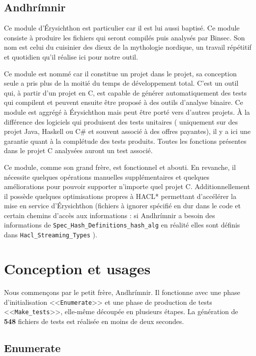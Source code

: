 \subsection*{Andhrímnir}

Ce module d'Érysichthon est particulier car il est lui aussi baptisé. Ce module consiste à produire les fichiers qui seront compilés puis analysés par Binsec. Son nom est celui du cuisinier des dieux de la mythologie nordique, un travail répétitif et quotidien qu'il réalise ici pour notre outil.\smallbreak

Ce module est nommé car il constitue un projet dans le projet, sa conception seule a pris plus de la moitié du temps de développement total. C'est un outil qui, à partir d'un projet en C, est capable de générer automatiquement des tests qui compilent et peuvent ensuite être proposé à des outils d'analyse binaire. Ce module est aggrégé à Érysichthon mais peut être porté vers d'autres projets. À la différence des logiciels qui produisent des tests unitaires ( uniquement sur des projet Java, Haskell ou C\# et souvent associé à des offres payantes), il y a ici une garantie quant à la complétude des tests produits. Toutes les fonctions présentes dans le projet C analysées auront un test associé.\smallbreak

Ce module, comme son grand frère, est fonctionnel et abouti. En revanche, il nécessite quelques opérations manuelles supplémentaires et quelques améliorations pour pouvoir supporter n'importe quel projet C. Additionnellement il possède quelques optimisations propres à HACL* permettant d'accélérer la mise en service d'Érysichthon (fichiers à ignorer spécifié en dur dans le code et certain chemins d'accès aux informations \eg : si Andhrímnir a besoin des informations de \texttt{Spec\_Hash\_Definitions\_hash\_alg} en réalité elles sont définis dans \texttt{Hacl\_Streaming\_Types} ).

\section{Conception et usages}

Nous commençons par le petit frère, Andhrímnir. Il fonctionne avec une phase d'initialisation <<\texttt{Enumerate}>> et une phase de production de tests <<\texttt{Make\_tests}>>, elle-même découpée en plusieurs étapes. La génération de \textbf{548} fichiers de tests est réalisée en moins de deux secondes.\smallbreak

\subsection*{Enumerate}

